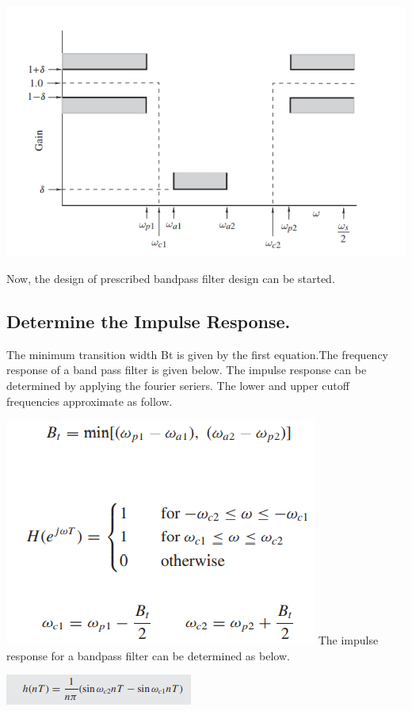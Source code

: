 \documentclass[oneside,11pt,onecolumn,a4paper]{report}
\begin{document}
\includegraphics{Screenshot (170)}

Now, the design of prescribed bandpass filter design can be started.

\subsection{Determine the Impulse Response.}

\hspace{4em}The minimum transition width Bt is given by the first equation.The frequency response of a band pass filter is given below. The impulse response can be determined by applying the fourier seriers. The lower and upper cutoff frequencies approximate as follow.


\includegraphics{Screenshot (172)}
The impulse response for a bandpass filter can be determined as below.


\includegraphics{Screenshot (177)}
\end{document}
